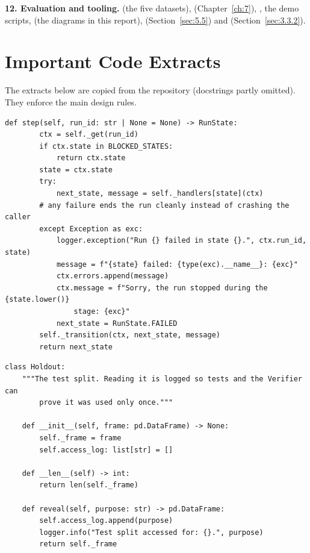 \textbf{12. Evaluation and tooling.}  (the five datasets),  (Chapter~\ref{ch:7}), , the demo scripts,  (the diagrams in this report),  (Section~\ref{sec:5.5}) and  (Section~\ref{sec:3.3.2}).

\FloatBarrier
\section{Important Code Extracts}\label{sec:5.4}

The extracts below are copied from the repository (docstrings partly omitted). They enforce the main design rules.

\begin{lstlisting}[caption={One step of the state machine --- failures end the run cleanly (\code{idss/\allowbreak{}agents/\allowbreak{}manager.\allowbreak{}py})},label={lst:5.1}]
    def step(self, run_id: str | None = None) -> RunState:
        ctx = self._get(run_id)
        if ctx.state in BLOCKED_STATES:
            return ctx.state
        state = ctx.state
        try:
            next_state, message = self._handlers[state](ctx)
        # any failure ends the run cleanly instead of crashing the caller
        except Exception as exc:
            logger.exception("Run {} failed in state {}.", ctx.run_id, state)
            message = f"{state} failed: {type(exc).__name__}: {exc}"
            ctx.errors.append(message)
            ctx.message = f"Sorry, the run stopped during the {state.lower()}
                stage: {exc}"
            next_state = RunState.FAILED
        self._transition(ctx, next_state, message)
        return next_state
\end{lstlisting}

\begin{lstlisting}[caption={The audited test split (\code{idss/\allowbreak{}ml/\allowbreak{}trainer.py})},label={lst:5.2}]
class Holdout:
    """The test split. Reading it is logged so tests and the Verifier can
        prove it was used only once."""

    def __init__(self, frame: pd.DataFrame) -> None:
        self._frame = frame
        self.access_log: list[str] = []

    def __len__(self) -> int:
        return len(self._frame)

    def reveal(self, purpose: str) -> pd.DataFrame:
        self.access_log.append(purpose)
        logger.info("Test split accessed for: {}.", purpose)
        return self._frame
\end{lstlisting}

